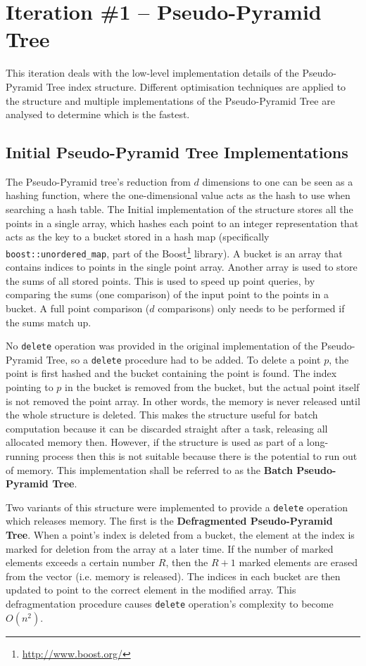 \section{Iteration \#1 -- Pseudo-Pyramid Tree}

This iteration deals with the low-level implementation details of the Pseudo-Pyramid Tree index structure. Different optimisation techniques are applied to the structure and  multiple implementations of the Pseudo-Pyramid Tree are analysed to determine which is the fastest.

\subsection{Initial Pseudo-Pyramid Tree Implementations}

The Pseudo-Pyramid tree's reduction from $d$ dimensions to one can be seen as a hashing function, where the one-dimensional value acts as the hash to use when searching a hash table. The Initial implementation of the structure stores all the points in a single array, which hashes each point to an integer representation that acts as the key to a bucket stored in a hash map (specifically \texttt{boost::unordered\_map}, part of the Boost\footnote{\url{http://www.boost.org/}} library). A bucket is an array that contains indices to points in the single point array. Another array is used to store the sums of all stored points. This is used to speed up point queries, by comparing the sums (one comparison) of the input point to the points in a bucket. A full point comparison ($d$ comparisons) only needs to be performed if the sums match up.

No \texttt{delete} operation was provided in the original implementation of the Pseudo-Pyramid Tree, so a \texttt{delete} procedure had to be added. To delete a point $p$, the point is first hashed and the bucket containing the point is found. The index pointing to $p$ in the bucket is removed from the bucket, but the actual point itself is not removed the point array. In other words, the memory is never released until the whole structure is deleted. This makes the structure useful for batch computation because it can be discarded straight after a task, releasing all allocated memory then. However, if the structure is used as part of a long-running process then this is not suitable because there is the potential to run out of memory. This implementation shall be referred to as the \textbf{Batch Pseudo-Pyramid Tree}.

Two variants of this structure were implemented to provide a \texttt{delete} operation which releases memory. The first is the \textbf{Defragmented Pseudo-Pyramid Tree}. When a point's index is deleted from a bucket, the element at the index is marked for deletion from the array at a later time. If the number of marked elements exceeds a certain number $R$, then the $R + 1$ marked elements are erased from the vector (i.e. memory is released). The indices in each bucket are then updated to point to the correct element in the modified array. This defragmentation procedure causes \texttt{delete} operation's complexity to become $O(n^2)$.

